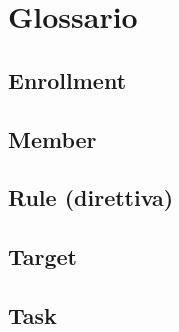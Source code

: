 \section{Glossario}
\subsection*{Enrollment}
\subsection*{Member}
\subsection*{Rule (direttiva)}
\subsection*{Target}
\subsection*{Task}